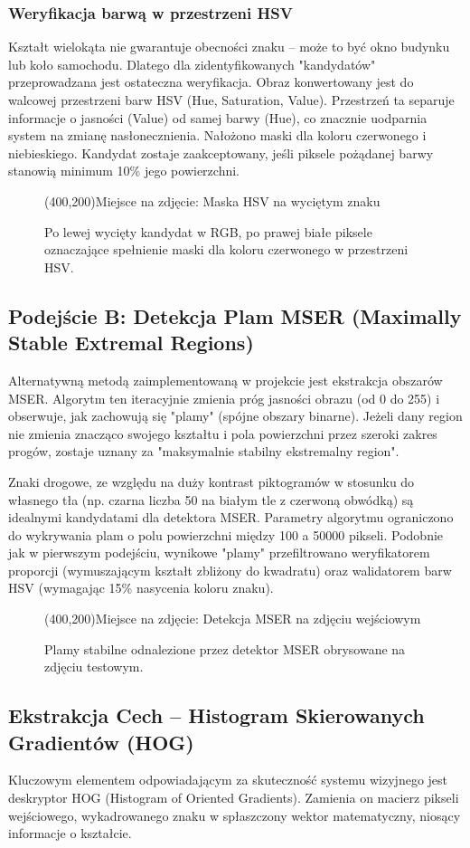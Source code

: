 \documentclass[12pt,a4paper]{article}
\newcommand{\placeholderimage}[2]{
    \begin{figure}[H]
        \centering
        \framebox(400,200){Miejsce na zdjęcie: #1}
        \caption{#2}
    \end{figure}
}
\begin{document}
\subsubsection{Weryfikacja barwą w przestrzeni HSV}
Kształt wielokąta nie gwarantuje obecności znaku -- może to być okno budynku lub koło samochodu. Dlatego dla zidentyfikowanych "kandydatów" przeprowadzana jest ostateczna weryfikacja. Obraz konwertowany jest do walcowej przestrzeni barw HSV (Hue, Saturation, Value). Przestrzeń ta separuje informacje o jasności (Value) od samej barwy (Hue), co znacznie uodparnia system na zmianę nasłonecznienia. Nałożono maski dla koloru czerwonego i niebieskiego. Kandydat zostaje zaakceptowany, jeśli piksele pożądanej barwy stanowią minimum 10\% jego powierzchni.

\placeholderimage{Maska HSV na wyciętym znaku}{Po lewej wycięty kandydat w RGB, po prawej białe piksele oznaczające spełnienie maski dla koloru czerwonego w przestrzeni HSV.}


\subsection{Podejście B: Detekcja Plam MSER (Maximally Stable Extremal Regions)}
Alternatywną metodą zaimplementowaną w projekcie jest ekstrakcja obszarów MSER. Algorytm ten iteracyjnie zmienia próg jasności obrazu (od 0 do 255) i obserwuje, jak zachowują się "plamy" (spójne obszary binarne). Jeżeli dany region nie zmienia znacząco swojego kształtu i pola powierzchni przez szeroki zakres progów, zostaje uznany za "maksymalnie stabilny ekstremalny region".

Znaki drogowe, ze względu na duży kontrast piktogramów w stosunku do własnego tła (np. czarna liczba 50 na białym tle z czerwoną obwódką) są idealnymi kandydatami dla detektora MSER.
Parametry algorytmu ograniczono do wykrywania plam o polu powierzchni między 100 a 50000 pikseli. Podobnie jak w pierwszym podejściu, wynikowe "plamy" przefiltrowano weryfikatorem proporcji (wymuszającym kształt zbliżony do kwadratu) oraz walidatorem barw HSV (wymagając 15\% nasycenia koloru znaku).

\placeholderimage{Detekcja MSER na zdjęciu wejściowym}{Plamy stabilne odnalezione przez detektor MSER obrysowane na zdjęciu testowym.}


\subsection{Ekstrakcja Cech -- Histogram Skierowanych Gradientów (HOG)}
Kluczowym elementem odpowiadającym za skuteczność systemu wizyjnego jest deskryptor HOG (Histogram of Oriented Gradients). Zamienia on macierz pikseli wejściowego, wykadrowanego znaku w spłaszczony wektor matematyczny, niosący informacje o kształcie.
\end{document}
